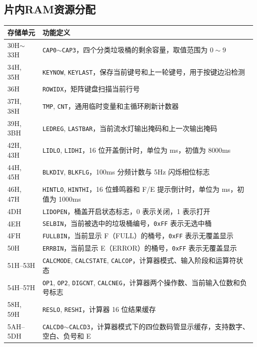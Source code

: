 \documentclass[12pt,a4paper]{article}
\begin{document}
\subsection{片内RAM资源分配}
\begin{table}[H]
    \centering
    \small
    \begin{tabular}{|p{3.2cm}|p{11.8cm}|}
        \hline
        存储单元 & 功能定义 \\
        \hline
        30H$\sim$33H & \texttt{CAP0$\sim$CAP3}，四个分类垃圾桶的剩余容量，取值范围为 $0\sim9$ \\
        \hline
        34H, 35H & \texttt{KEYNOW}, \texttt{KEYLAST}，保存当前键号和上一轮键号，用于按键边沿检测 \\
        \hline
        36H & \texttt{ROWIDX}，矩阵键盘扫描当前行号 \\
        \hline
        37H, 38H & \texttt{TMP}, \texttt{CNT}，通用临时变量和主循环刷新计数器 \\
        \hline
        39H, 3BH & \texttt{LEDREG}, \texttt{LASTBAR}，当前流水灯输出掩码和上一次输出掩码 \\
        \hline
        42H, 43H & \texttt{LIDLO}, \texttt{LIDHI}，16 位开盖倒计时，单位为 ms，初值为 8000ms \\
        \hline
        44H, 45H & \texttt{BLKDIV}, \texttt{BLKFLG}，100ms 分频计数与 5Hz 闪烁相位标志 \\
        \hline
        46H, 47H & \texttt{HINTLO}, \texttt{HINTHI}，16 位蜂鸣器和 F/E 提示倒计时，单位为 ms，初值为 1000ms \\
        \hline
        4DH & \texttt{LIDOPEN}，桶盖开启状态标志，0 表示关闭，1 表示打开 \\
        \hline
        4EH & \texttt{SELBIN}，当前被选中的垃圾桶编号，\texttt{0xFF} 表示无选中桶 \\
        \hline
        4FH & \texttt{FULLBIN}，当前显示 F（FULL）的桶号，\texttt{0xFF} 表示无覆盖显示 \\
        \hline
        50H & \texttt{ERRBIN}，当前显示 E（ERROR）的桶号，\texttt{0xFF} 表示无覆盖显示 \\
        \hline
        51H--53H & \texttt{CALCMODE}, \texttt{CALCSTATE}, \texttt{CALCOP}，计算器模式、输入阶段和运算符状态 \\
        \hline
        54H--57H & \texttt{OP1}, \texttt{OP2}, \texttt{DIGCNT}, \texttt{CALCNEG}，计算器两个操作数、当前输入位数和负号标志 \\
        \hline
        58H, 59H & \texttt{RESLO}, \texttt{RESHI}，计算器 16 位结果缓存 \\
        \hline
        5AH--5DH & \texttt{CALCD0$\sim$CALCD3}，计算器模式下的四位数码管显示缓存，支持数字、空白、负号和 E \\
        \hline
    \end{tabular}
\end{table}
\end{document}
